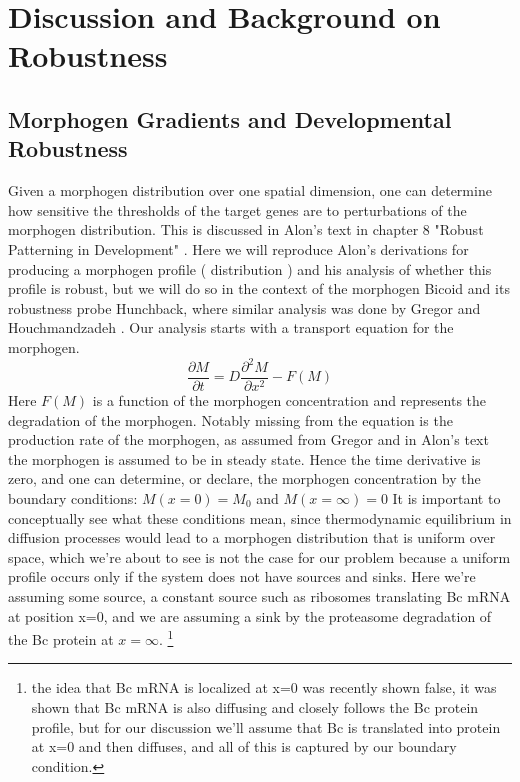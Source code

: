 \section{Discussion and Background on Robustness}
\subsection{Morphogen Gradients and Developmental Robustness}

Given a morphogen distribution over one spatial dimension, one can determine how sensitive the thresholds of the target genes are to perturbations of the morphogen distribution.  This is discussed in Alon's text in chapter 8 "Robust Patterning in Development" \cite{designp}.  Here we will reproduce Alon's derivations for producing a morphogen profile ( distribution ) and his analysis of whether this profile is robust, but we will do so in the context of the morphogen Bicoid and its robustness probe Hunchback, where similar analysis was done by Gregor and Houchmandzadeh \cite{pmid17632062}\cite{pmid11845210}.  Our analysis starts with a transport equation for the morphogen.
\begin{equation}\label{}
    \frac{\partial M}{\partial t} =  D \frac{\partial^2 M }{\partial x^2} - F(M)
\end{equation}
Here $F(M)$ is a function of the morphogen concentration and represents the degradation of the morphogen.  Notably missing from the equation is the production rate of the morphogen, as assumed from Gregor and in Alon's text the morphogen is assumed to be in steady state\cite{designp}.  Hence the time derivative is zero, and one can determine, or declare, the morphogen concentration by the boundary conditions:
$
    M(x = 0) = M_0 $ and $  M(x=\infty) = 0
$
 It is important to conceptually see what these conditions mean, since thermodynamic equilibrium in diffusion processes would lead to a morphogen distribution that is uniform over space, which we're about to see is not the case for our problem because a uniform profile occurs only if the system does not have sources and sinks.  Here we're assuming some source, a constant source such as ribosomes translating Bc mRNA at position x=0, and we are assuming a sink by the proteasome degradation of the Bc protein at $x=\infty$. \footnote[1]{ the idea that Bc mRNA is localized at x=0 was recently shown false, it was shown that Bc mRNA is also diffusing and closely follows the Bc protein profile, but for our discussion we'll assume that Bc is translated into protein at x=0 and then diffuses, and all of this is captured by our boundary condition.}
